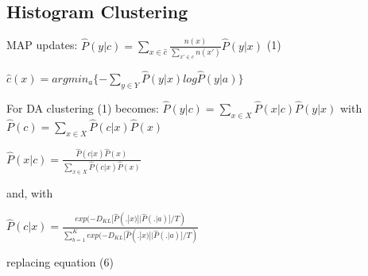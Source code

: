\documentclass[9pt,parskip]{scrartcl}
\begin{document}
\begin{multicols*}{4}
\subsection*{Histogram Clustering}
MAP updates:
$\hat{P}(y|c) = \sum_{x \in \hat{c}}{\frac{n(x)}{\sum_{x' \in c}n(x')}\hat{P}(y|x)} $  (1)

$\hat{c}(x) = argmin_{a}\{-\sum_{y\in Y}{\hat{P}(y|x)log\hat{P}(y|a)}\}$  

For DA clustering (1) becomes:
$\hat{P}(y|c)=\sum_{x \in X}\hat{P}(x|c) \hat{P}(y|x)$
with
$\hat{P}(c) = \sum_{x \in X}\hat{P}(c|x)\hat{P}(x)$

$\hat{P}(x|c) = \frac{\hat{P}(c|x)\hat{P}(x)}{\sum_{x \in X}\hat{P}(c|x)\hat{P}(x)}$

and, with

$\hat{P}(c|x) = \frac{exp(-D_{KL}[\hat{P}(.|x)||\hat{P}(.|a)]/T)}{\sum_{b=1}^{K}exp(-D_{KL}[\hat{P}(.|x)||\hat{P}(.|a)]/T)}$ 

replacing equation (6)


\end{multicols*}
\end{document}

